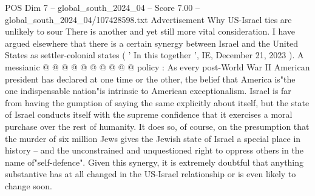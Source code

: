 \begin{textsample}{POS Dim 7 – global\_south\_2024\_04 – Score 7.00 – global\_south\_2024\_04/107428598.txt}
Advertisement Why US-Israel ties are unlikely to sour There is another and yet still more vital consideration.
I have argued elsewhere that there is a certain synergy between Israel and the United States as settler-colonial states ( ' In this together ', IE, December 21, 2023 ).
A messianic @ @ @ @ @ @ @ @ @ @ policy : As every post-World War II American president has declared at one time or the other, the belief that America is"the one indispensable nation"is intrinsic to American exceptionalism.
Israel is far from having the gumption of saying the same explicitly about itself, but the state of Israel conducts itself with the supreme confidence that it exercises a moral purchase over the rest of humanity.
It does so, of course, on the presumption that the murder of six million Jews gives the Jewish state of Israel a special place in history -- and the unconstrained and unquestioned right to oppress others in the name of"self-defence".
Given this synergy, it is extremely doubtful that anything substantive has at all changed in the US-Israel relationship or is even likely to change soon.

\end{textsample}
